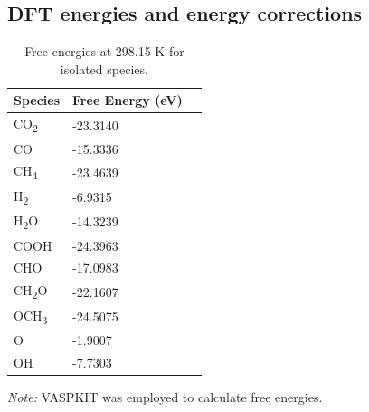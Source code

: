\subsection{DFT energies and energy corrections}
\label{supp_sec2.3_energies}

\begin{table}[htbp]
\label{supp_table2:species_free_energies}
  \caption{Free energies at 298.15 K for isolated species.}
  \center
  \small
  \begin{tabularx}{0.5\textwidth}{@{}lXr@{}}
    \toprule
    Species               & Free Energy (eV)  \\
    \midrule
    CO\textsubscript{2}   & -23.3140          \\
    CO                    & -15.3336          \\
    CH\textsubscript{4}   & -23.4639          \\
    H\textsubscript{2}    & -6.9315           \\
    H\textsubscript{2}O   & -14.3239          \\
    COOH                  & -24.3963          \\
    CHO                   & -17.0983          \\
    CH\textsubscript{2}O  & -22.1607          \\
    OCH\textsubscript{3}  & -24.5075          \\
    O                     & -1.9007           \\
    OH                    & -7.7303           \\
    \bottomrule
  \end{tabularx}

  \smallskip

  \begin{flushright}
  \begin{minipage}{\textwidth}
    \footnotesize\textit{Note:} VASPKIT \cite{wang2021vaspkit} was employed to calculate free energies.
  \end{minipage}
  \end{flushright}
\end{table}


